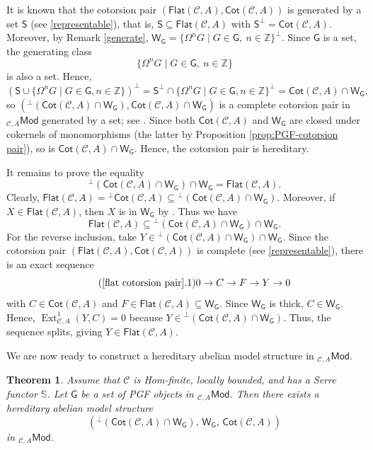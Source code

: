 \documentclass{amsart}
\theoremstyle{bfupright head,slanted body}
\theoremstyle{bfupright head,upright body}
\theoremstyle{fixed bf head,slanted body}
\newtheorem{thm}[res]{Theorem}          \newtheorem*{thm*}{Theorem}
\theoremstyle{fixed bf head,upright body}
\theoremstyle{numbered paragraph}
\newenvironment{prf*}[1][Proof]{%
	\begin{proof}[\bf #1]
		\setcounter{equation}{0}
		\renewcommand{\theequation}{\arabic{equation}}}
	{\end{proof}
}
\numberwithin{equation}{res}
\newcommand{\Flat}[1]{\mathsf{Flat}(#1)}
\newcommand{\Cot}[1]{\mathsf{Cot}(#1)}
\newcommand{\Mod}[1]{{_{#1}\mathsf{Mod}}}
\newcommand{\Ext}[4][]{\operatorname{Ext}_{#1}^{#2}(#3,#4)}
\newcommand{\G}{\mathsf{G}}
\newcommand{\Se}{\mathsf{S}}
\newcommand{\WG}{\mathsf{W}_{\mathsf{G}}}
\newcommand{\C}{\mathcal{C}}
\begin{document}
\begin{prf*}
It is known that the cotorsion pair $(\Flat{\C,A}, \Cot{\C,A})$ is generated by a set $\Se$ (see \ref{representable}), that is, $\Se \subseteq \Flat{\C,A}$ with $\Se^\perp = \Cot{\C,A}$. Moreover, by Remark \ref{generate},
$\WG=\{\Omega^{n}G\mid G\in\G,\ n\in\mathbb{Z}\}^{\perp}$.
Since $\G$ is a set, the generating class
\[\{\Omega^{n}G\mid G\in\G,\ n\in\mathbb{Z}\}\]
is also a set.
Hence,
\[(\Se \cup \{\Omega^{n}G\mid G\in\G,n\in\mathbb{Z}\})^\perp = \Se^\perp \cap \{\Omega^{n}G\mid G\in\G,n\in\mathbb{Z}\}^\perp = \Cot{\C,A} \cap \WG,\]
so $(^{\perp}(\Cot{\C,A} \cap \WG), \Cot{\C,A} \cap \WG)$ is a complete cotorsion pair in $\Mod{\C,A}$ generated by a set; see \cite[Theorem 6.11(b)]{RT12}.
Since both $\Cot{\C,A}$ and $\WG$ are closed under cokernels of monomorphisms (the latter by Proposition \ref{prop:PGF-cotorsion pair}), so is $\Cot{\C,A} \cap \WG$. Hence, the cotorsion pair is hereditary.

It remains to prove the equality
\[
^{\perp}(\Cot{\C,A} \cap \WG) \cap \WG = \Flat{\C,A}.
\]
Clearly,
$\Flat{\C,A} = {^{\perp}\Cot{\C,A}} \subseteq {^{\perp}(\Cot{\C,A} \cap \WG)}$.
Moreover, if $X \in \Flat{\C,A}$, then $X$ is in $\WG$ by \cite[Theorem 4.4]{SS20}. Thus we have
$$\Flat{\C,A} \subseteq{^{\perp} (\Cot{\C,A} \cap \WG) \cap \WG}.$$
For the reverse inclusion, take $Y \in{^{\perp}(\Cot{\C,A} \cap \WG) \cap\WG}$. Since the cotorsion pair $(\Flat{\C,A}, \Cot{\C,A})$ is complete (see \ref{representable}), there is an exact sequence
\begin{equation*}\label{eq:ipg1}\tag{\ref{flat cotorsion pair}.1}
0 \to C \to F \to Y \to 0
\end{equation*}
with $C \in \Cot{\C,A}$ and $F \in \Flat{\C,A} \subseteq \WG$. Since $\WG$ is thick, $C\in\WG$. Hence, $\Ext[\C,A]{1}{Y}{C}=0$ because $Y\in{^{\perp}(\Cot{\C,A}\cap\WG)}$. Thus, the sequence splits, giving $Y\in\Flat{\C,A}$.
\end{prf*}

We are now ready to construct a hereditary abelian model structure in $\Mod{\C,A}$.

\begin{thm}\label{thm:model structure-PGF}
Assume that $\C$ is Hom-finite, locally bounded, and has a Serre functor $\mathbb{S}$. Let $\G$ be a set of PGF objects in $\Mod{\C,A}$.
Then there exists a hereditary abelian model structure
\[({^{\perp}(\Cot{\C,A}\cap\WG)}, \, \WG, \, \Cot{\C,A})\]
in $\Mod{\C,A}$.
\end{thm}
\end{document}
